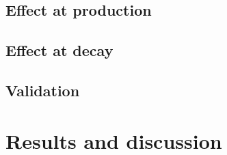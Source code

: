 \subsection{Effect at production}

\subsection{Effect at decay}

\subsection{Validation}

\section{Results and discussion}
